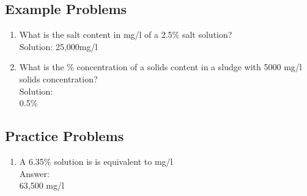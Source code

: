 \documentclass{article}
\begin{document}
 
\subsection{Example Problems} 
\begin{enumerate}
\item What is the salt content in mg/l of a 2.5\% salt solution?\\
Solution:
25,000mg/l
\item What is the \% concentration of a solids content in a sludge with 5000 mg/l solids concentration?\\
Solution:\\
0.5\%\\
\end{enumerate}
\subsection{Practice Problems} 

\begin{enumerate}
\item A 6.35\% solution is is equivalent to {\underline{\hspace{1cm}}} mg/l\\
Answer:\\
63,500 mg/l\\
\end{enumerate}
\vspace{0.3cm}
\end{document}

